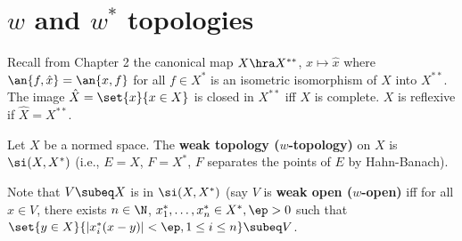 \section{$w$ and $w^*$ topologies}

Recall from Chapter 2 the canonical map $X\hra X^{**}$, $x\mapsto \hat x$ where $\an{f,\hat x}=\an{x,f}$ for all $f\in X^*$ is an isometric isomorphism of $X$ into $X^{**}$. The image $\hat{X}=\set{x}{x\in X}$ is closed in $X^{**}$ iff $X$ is complete. $X$ is reflexive if $\hat X=X^{**}$. 

\begin{df}
Let $X$ be a normed space. The \textbf{weak topology ($w$-topology)} on $X$ is $\si(X,X^*)$ (i.e., $E=X$, $F=X^*$, $F$ separates the points of $E$ by Hahn-Banach).
\end{df}

Note that $V\subeq X$ is in $\si(X,X^*)$ (say $V$ is \textbf{weak open ($w$-open)} iff for all $x\in V$, there exists $n\in \N$, $x_1^*,\ldots, x_n^*\in X^*,\ep>0$ such that $\set{y\in X}{|x_i^*(x-y)|<\ep,1\le i\le n}\subeq V$. %

